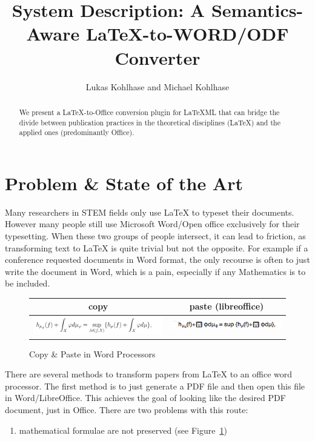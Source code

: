 \documentclass{llncs}
\title{System Description: A Semantics-Aware {\LaTeX}-to-WORD/ODF Converter}
\author{Lukas Kohlhase and Michael Kohlhase}
\institute{Mathematics/Computer Science\\
  Jacobs University Bremen}
\begin{document}
\maketitle
\begin{abstract}
  We present a {\LaTeX}-to-Office conversion plugin for {\LaTeX}ML that can bridge the
  divide between publication practices in the theoretical disciplines (\LaTeX) and the
  applied ones (predominantly Office). 
\end{abstract}

\section{Problem \& State of the Art}\label{sec:intro}

Many researchers in STEM fields only use {\LaTeX} to typeset their documents. However many
people still use Microsoft Word/Open office exclusively for their typesetting. When these
two groups of people intersect, it can lead to friction, as transforming text to {\LaTeX}
is quite trivial but not the opposite. For example if a conference requested documents in
Word format, the only recourse is often to just write the document in Word, which is a
pain, especially if any Mathematics is to be included.


\begin{figure}[ht]
  \begin{tabular}{|c|c|}\hline%
    copy & paste (libreoffice)\\\hline
    \includegraphics[width=6cm]{mathsnippet} & 
    \includegraphics[width=5cm]{mathsnippet-libreoffice}\\\hline
  \end{tabular}
\caption{Copy \& Paste in Word Processors}\label{fig:cnp}
\end{figure}

There are several methods to transform papers from {\LaTeX} to an office word
processor. The first method is to just generate a PDF file and then open this file in
Word/LibreOffice. This achieves the goal of looking like the desired PDF document, just in
Office. There are two problems with this route: 
\begin{enumerate}
\item mathematical formulae are not preserved (see Figure~\ref{fig:cnp})
\end{enumerate}
\end{document}
